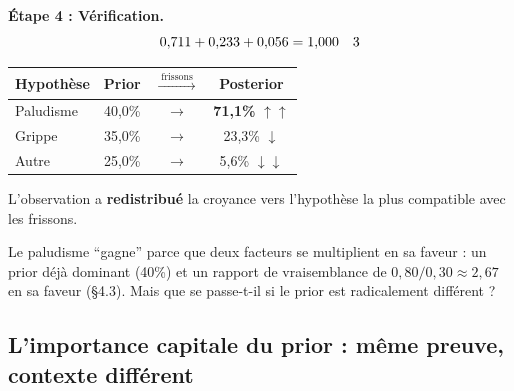 \documentclass[11pt,a4paper]{article}
\newcommand{\cmark}{\ding{51}}
\begin{document}
\textbf{Étape 4 : Vérification.}
$$0{,}711 + 0{,}233 + 0{,}056 = 1{,}000 \quad \cmark$$

\begin{retenirbox}
\begin{center}
\begin{tabular}{lccc}
\toprule
\textbf{Hypothèse} & \textbf{Prior} & $\xrightarrow{\;\text{frissons}\;}$ & \textbf{Posterior} \\
\midrule
Paludisme & 40,0\% & $\longrightarrow$ & \textbf{71,1\%} $\uparrow\uparrow$ \\
Grippe & 35,0\% & $\longrightarrow$ & 23,3\% $\downarrow$ \\
Autre & 25,0\% & $\longrightarrow$ & 5,6\% $\downarrow\downarrow$ \\
\bottomrule
\end{tabular}
\end{center}

L'observation a \textbf{redistribué} la croyance vers l'hypothèse la plus compatible avec les frissons.
\end{retenirbox}

Le paludisme ``gagne'' parce que deux facteurs se multiplient en sa faveur : un prior déjà dominant (40\%) et un rapport de vraisemblance de $0{,}80/0{,}30 \approx 2{,}67$ en sa faveur (§4.3). Mais que se passe-t-il si le prior est radicalement différent ?

\subsection{L'importance capitale du prior : même preuve, contexte différent}
\end{document}
